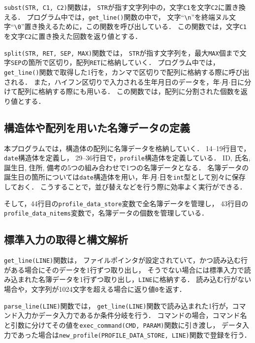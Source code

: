 \documentclass[autodetect-engine,dvi=dvipdfmx,ja=standard,
               a4j,11pt]{bxjsarticle}
\begin{document}
\verb|subst(STR, C1, C2)|関数は，
\verb|STR|が指す文字列中の，文字\verb|C1|を文字\verb|C2|に置き換える．
プログラム中では，\verb|get_line()|関数の中で，
文字``\verb|\n|''を終端ヌル文字``\verb|\0|''置き換えるために，この関数を呼び出している．
この関数では，文字\verb|C1|を文字\verb|C2|に置き換えた回数を返り値とする．

\verb|split(STR, RET, SEP, MAX)|関数では，
\verb|STR|が指す文字列を，最大\verb|MAX|個まで文字\verb|SEP|の箇所で区切り，配列\verb|RET|に格納していく．
プログラム中では，\verb|get_line()|関数で取得した1行を，カンマで区切りで配列に格納する際に呼び出される．
また，ハイフン区切りで入力される生年月日のデータを，年$\cdot$月$\cdot$日に分けて配列に格納する際にも用いる．
この関数では，配列に分割された個数を返り値とする．

\subsection{構造体や配列を用いた名簿データの定義}

本プログラムでは，構造体の配列に名簿データを格納していく．
14--19行目で，\verb|date|構造体を定義し，
29--36行目で，\verb|profile|構造体を定義している．
ID, 氏名, 誕生日, 住所, 備考の5つの組み合わせで1つの名簿データとなる．
名簿データの誕生日の箇所については\verb|date|構造体を用い，年$\cdot$月$\cdot$日を\verb|int|型として別々に保存しておく．
こうすることで，並び替えなどを行う際に効率よく実行ができる．

そして，44行目の\verb|profile_data_store|変数で全名簿データを管理し，
43行目の\verb|profile_data_nitems|変数で，名簿データの個数を管理している．

\subsection{標準入力の取得と構文解析}

\verb|get_line(LINE)|関数は，
ファイルポインタが設定されていて，かつ読み込む行がある場合にそのデータを1行ずつ取り出し，
そうでない場合には標準入力で読み込まれた名簿データを1行ずつ取り出し，\verb|LINE|に格納する．
読み込む行がない場合や，文字列が1024文字を超える場合に返り値\verb|0|を返す．

\verb|parse_line(LINE)|関数では，
\verb|get_line(LINE)|関数で読み込まれた1行が，コマンド入力かデータ入力であるか条件分岐を行う．
コマンドの場合，コマンド名と引数に分けてその値を\verb|exec_command(CMD, PARAM)|関数に引き渡し，
データ入力であった場合は\verb|new_profile(PROFILE_DATA_STORE, LINE)|関数で登録を行う．
\end{document}

